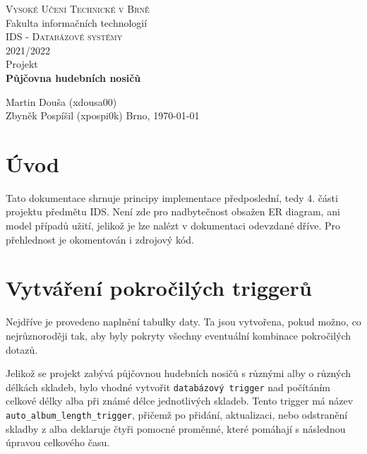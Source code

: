 \documentclass{article}
\begin{document}
\clearpage
\begin{titlepage}
	\begin{center}
		\textsc{\LARGE Vysoké Učení Technické v Brně}\\[0.5cm]
		{\LARGE Fakulta informačních technologií }\\[4.0cm]

		\textsc{\LARGE IDS - Databázové systémy}\\[0.5cm]
		\textsc{\LARGE 2021/2022}\\[3.5cm]

		{\LARGE Projekt}\\[0.5cm]
    {\LARGE \textbf{Půjčovna hudebních nosičů}}\\
	\end{center}

	\vfill 

	\begin{flushleft} 
		\large
		Martin Douša (xdousa00)\\
    Zbyněk Pospíšil (xpospi0k)
		\hfill
		Brno, \today
	\end{flushleft}
\end{titlepage}
\thispagestyle{empty}



\newpage
\section{Úvod}
Tato dokumentace shrnuje principy implementace předposlední, tedy 4. části projektu předmětu IDS. Není zde pro nadbytečnost obsažen ER diagram, ani model případů užití, jelikož je lze nalézt v dokumentaci odevzdané dříve. Pro přehlednost je okomentován i zdrojový kód.

\section{Vytváření pokročilých triggerů}
Nejdříve je provedeno naplnění tabulky daty. Ta jsou vytvořena, pokud možno, co nejrůznoroději tak, aby byly pokryty všechny eventuální kombinace pokročilých dotazů.

Jelikož se projekt zabývá půjčovnou hudebních nosičů s různými alby o různých délkách skladeb, bylo vhodné vytvořit \texttt{databázový trigger} nad počítáním celkové délky alba při známé délce jednotlivých skladeb. Tento trigger má název \texttt{auto\_album\_length\_trigger}, přičemž po přidání, aktualizaci, nebo odstranění skladby z alba deklaruje čtyři pomocné proměnné, které pomáhají s následnou úpravou celkového času.
\end{document}
